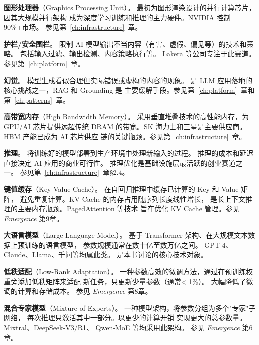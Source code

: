 \begin{description}[style=nextline, leftmargin=2.5cm, labelwidth=2.3cm, font=\bfseries]
\item[GPU]
\textbf{图形处理器}（Graphics Processing Unit）。
最初为图形渲染设计的并行计算芯片，因其大规模并行架构
成为深度学习训练和推理的主力硬件。NVIDIA 控制90\%+市场。
参见第~\ref{ch:infrastructure}~章。

\item[Guardrails]
\textbf{护栏/安全围栏}。
限制 AI 模型输出不当内容（有害、虚假、偏见等）的技术和策略。
包括输入过滤、输出检测、内容策略执行等。
Lakera 等公司专注于此赛道。参见第~\ref{ch:platform}~章。

\item[Hallucination]
\textbf{幻觉}。
模型生成看似合理但实际错误或虚构的内容的现象。
是 LLM 应用落地的核心挑战之一，RAG 和 Grounding 是
主要缓解手段。参见第~\ref{ch:platform}~章和第~\ref{ch:patterns}~章。

\item[HBM]
\textbf{高带宽内存}（High Bandwidth Memory）。
采用垂直堆叠技术的高性能内存，为 GPU/AI 芯片提供远超传统 DRAM
的带宽。SK 海力士和三星是主要供应商。HBM 产能已成为 AI 芯片供应
链的关键瓶颈。参见第~\ref{ch:infrastructure}~章。

\item[Inference]
\textbf{推理}。
将训练好的模型部署到生产环境中处理新输入的过程。
推理的成本和延迟直接决定 AI 应用的商业可行性。
推理优化是基础设施层最活跃的创业赛道之一。
参见第~\ref{ch:infrastructure}~章§2.4。

\item[KV Cache]
\textbf{键值缓存}（Key-Value Cache）。
在自回归推理中缓存已计算的 Key 和 Value 矩阵，
避免重复计算。KV Cache 的内存占用随序列长度线性增长，
是长上下文推理的主要内存瓶颈。PagedAttention 等技术
旨在优化 KV Cache 管理。参见 \textit{Emergence} 第9章。

\item[LLM]
\textbf{大语言模型}（Large Language Model）。
基于 Transformer 架构、在大规模文本数据上预训练的语言模型，
参数规模通常在数十亿至数万亿之间。
GPT-4、Claude、Llama、千问等均属此类。
是本书讨论的核心技术对象。

\item[LoRA]
\textbf{低秩适配}（Low-Rank Adaptation）。
一种参数高效的微调方法，通过在预训练权重旁添加低秩矩阵来适配
新任务，只更新少量参数（通常< 1\%）。
大幅降低了微调的计算和存储成本。
参见 \textit{Emergence} 第8章。

\item[MoE]
\textbf{混合专家模型}（Mixture of Experts）。
一种模型架构，将参数分组为多个"专家"子网络，
每次推理只激活其中一部分。以更少的计算开销
实现更大的总参数量。Mixtral、DeepSeek-V3/R1、
Qwen-MoE 等均采用此架构。
参见 \textit{Emergence} 第6章。


\end{description}

